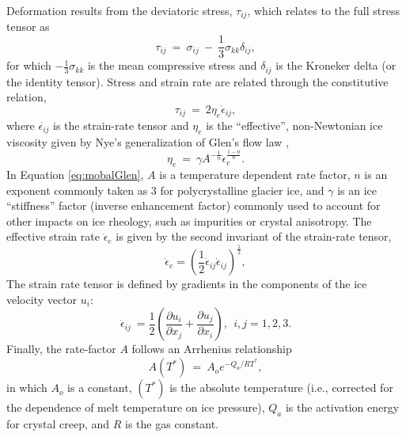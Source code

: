 Deformation results from the deviatoric stress, $\tau_{ ij}$, which relates to the full stress tensor as
\begin{equation}
\tau_{ ij} ~ = ~ \sigma _{ ij} ~ - ~{\frac{ 1}{ 3}} \sigma _{ kk} \delta _{ ij},
\label{eq:mobaldevia}
\end{equation}
\noindent
for which ${-\frac{1}{ 3}} \sigma _{ kk}$ is the mean compressive stress and $\delta_{ ij}$ is the Kroneker delta (or the identity tensor). 
Stress and strain rate are related through the constitutive relation,
\begin{equation}
\tau_{ij}~=~2 \eta_{e} \dot{\epsilon}_{ij},
\label{eq:tauij}
\end{equation}
where $\dot{\epsilon_{ij}}$ is the strain-rate tensor and $\eta_{e}$ is the ``effective'', non-Newtonian ice viscosity given by Nye's generalization of Glen's flow law \citep{Glen1955}, 
\begin{equation}
\eta_{e}~=~\gamma A^{-\frac{1}{n}} \dot{\epsilon}_{e}^{\frac{1-n}{n}}.
\label{eq:mobalGlen}
\end{equation}
In Equation \ref{eq:mobalGlen}, $A$ is a temperature dependent rate factor, $n$ is an exponent commonly taken as 3 for polycrystalline glacier ice, and $\gamma$ is an ice ``stiffness'' factor (inverse enhancement factor) commonly used to account for other impacts on ice rheology, such as impurities or crystal anisotropy. 
The effective strain rate $\dot{\epsilon}_{e}$  is given by the second invariant of the strain-rate tensor,
\begin{equation}
\dot{\epsilon}_{e}=\left(\frac{1}{2}\dot{\epsilon}_{ij}\dot{\epsilon}_{ij}\right)^{\frac{1}{2}},
\label{eq:effstrain}
\end{equation}
The strain rate tensor is defined by gradients in the components of the ice velocity vector $u_i$:
\begin{equation}
\dot{\epsilon}_{ij}~= \frac{1}{2}\left( \frac{ \partial u_{i}}{\partial x_{j}} + \frac{ \partial u_{j}}{\partial x_{i}}\right), ~~i,j = 1,2,3.
\label{eq:mobalstrainrate}
\end{equation}
Finally, the rate-factor $A$ follows an Arrhenius relationship
\begin{equation}
A\left( T^{*}\right)~=~A_{o}e^{-Q_a/RT^{*}},
\label{eq:mobalA}
\end{equation}
\noindent
in which $A_{o}$ is a constant, $(T^{*})$ is the absolute temperature (i.e., corrected for the dependence of melt temperature on ice pressure),
$Q_a$ is the activation energy for crystal creep, and $R$ is the gas constant.

